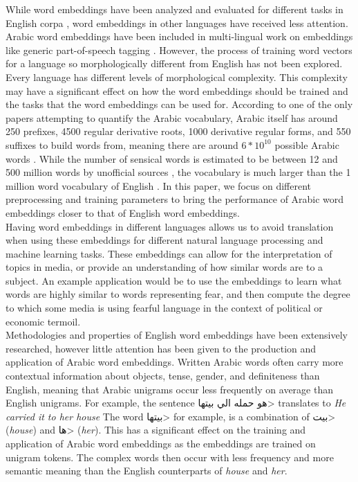 While word embeddings have been analyzed and evaluated for different tasks in English corpa \cite{mikoloveffic:2013,dos2014deep}, word embeddings in other languages have received less attention. Arabic word embeddings have been included in multi-lingual work on embeddings like generic part-of-speech tagging \cite{al:2013}. However, the process of training word vectors for a language so morphologically different from English has not been explored. Every language has different levels of morphological complexity. This complexity may have a significant effect on how the word embeddings should be trained and the tasks that the word embeddings can be used for. According to one of the only papers attempting to quantify the Arabic vocabulary, Arabic itself has around 250 prefixes, 4500 regular derivative roots, 1000 derivative regular forms, and 550 suffixes to build words from, meaning there are around $6*10^{10}$ possible Arabic words \cite{ahmed2000alarge}. While the number of sensical words is estimated to be between 12 and 500 million words by unofficial sources \cite{Lameen:2013,Muhammad:2015}, the vocabulary is much larger than the 1 million word vocabulary of English \cite{Googl96:online}. In this paper, we focus on different preprocessing and training parameters to bring the performance of Arabic word embeddings closer to that of English word embeddings.
\\
Having word embeddings in different languages allows us to avoid translation when using these embeddings for different natural language processing and machine learning tasks. These embeddings can allow for the interpretation of topics in media, or provide an understanding of how similar words are to a subject. An example application would be to use the embeddings to learn what words are highly similar to words representing fear, and then compute the degree to which some media is using fearful language in the context of political or economic termoil.
\\
Methodologies and properties of English word embeddings have been extensively researched, however little attention has been given to the production and application of Arabic word embeddings. Written Arabic words often carry more contextual information about objects, tense, gender, and definiteness than English, meaning that Arabic unigrams occur less frequently on average than English unigrams. For example, the sentence \<هو حمله الي بيتها> translates to \textit{He carried it to her house} The word \<بيتها> for example, is a combination of \<بيت> (\textit{house}) and \<ها> (\textit{her}). This has a significant effect on the training and application of Arabic word embeddings as the embeddings are trained on unigram tokens. The complex words then occur with less frequency and more semantic meaning than the English counterparts of \textit{house} and \textit{her}.
